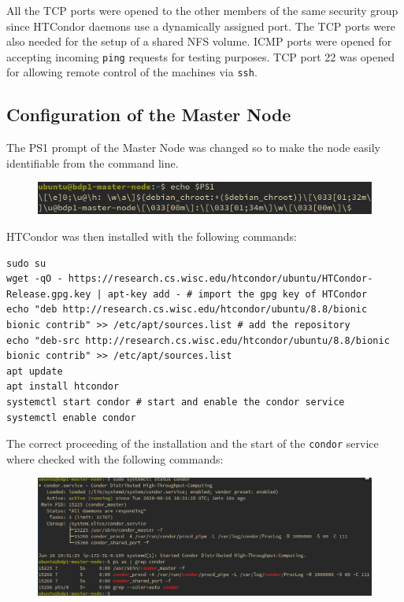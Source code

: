 \documentclass{article}
\begin{document}
All the TCP ports were opened to the other members of the same security group since HTCondor daemons use a dynamically assigned port.
The TCP ports were also needed for the setup of a shared NFS volume.
ICMP ports were opened for accepting incoming \texttt{ping} requests for testing purposes.
TCP port 22 was opened for allowing remote control of the machines via \texttt{ssh}.

\subsection{Configuration of the Master Node}
The PS1 prompt of the Master Node was changed so to make the node easily identifiable from the command line.

\begin{figure}[!h]
    \center
    \includegraphics[width=\textwidth]{./images/master-ps1.png}
\end{figure}

HTCondor was then installed with the following commands:

\begin{lstlisting}
sudo su
wget -qO - https://research.cs.wisc.edu/htcondor/ubuntu/HTCondor-Release.gpg.key | apt-key add - # import the gpg key of HTCondor
echo "deb http://research.cs.wisc.edu/htcondor/ubuntu/8.8/bionic bionic contrib" >> /etc/apt/sources.list # add the repository
echo "deb-src http://research.cs.wisc.edu/htcondor/ubuntu/8.8/bionic bionic contrib" >> /etc/apt/sources.list
apt update
apt install htcondor
systemctl start condor # start and enable the condor service
systemctl enable condor
\end{lstlisting}

The correct proceeding of the installation and the start of the \texttt{condor} service where checked with the following commands:

\begin{figure}[!h]
    \center
    \includegraphics[width=\textwidth]{./images/condor_installed.png}
\end{figure}
\end{document}
